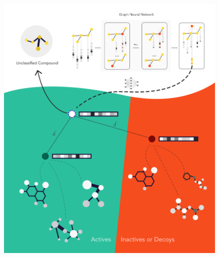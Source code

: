 \documentclass[journal=jcisd8,manuscript=article]{achemso} %
\begin{document}
\begin{figure}[!ht]
	\centering
	\includegraphics[width=0.95\linewidth]{img/For Table of Contents Only.png}
\end{figure}
\end{document}

